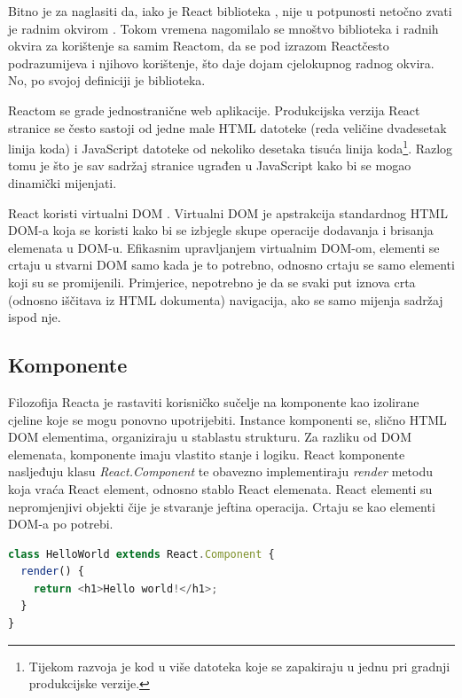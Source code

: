 \documentclass[times, utf8, zavrsni, numeric]{fer}
\newcommand{\razmakp}{\vspace{18pt}}
\newcommand{\razmaks}{\vspace{10pt}}
\begin{document}
Bitno je za naglasiti da, iako je React biblioteka , nije u potpunosti netočno zvati je radnim okvirom .
Tokom vremena nagomilalo se mnoštvo biblioteka i radnih okvira za korištenje sa samim Reactom, da se pod izrazom \glqq React\grqq često podrazumijeva i njihovo korištenje, što daje dojam cjelokupnog radnog okvira.
No, po svojoj definiciji je biblioteka\citep{reactGithub}.

\razmakp

Reactom se grade jednostranične  web aplikacije.
Produkcijska verzija React stranice se često sastoji od jedne male HTML datoteke (reda veličine dvadesetak linija koda) i JavaScript datoteke od nekoliko desetaka tisuća linija koda\footnote{Tijekom razvoja je kod u više datoteka koje se zapakiraju u jednu pri gradnji produkcijske verzije.}.
Razlog tomu je što je sav sadržaj stranice ugrađen u JavaScript kako bi se mogao dinamički mijenjati.

React koristi virtualni DOM .
Virtualni DOM je apstrakcija standardnog HTML DOM-a koja se koristi kako bi se izbjegle skupe operacije dodavanja i brisanja elemenata u DOM-u.
Efikasnim upravljanjem virtualnim DOM-om, elementi se crtaju u stvarni DOM samo kada je to potrebno, odnosno crtaju se samo elementi koji su se promijenili.
Primjerice, nepotrebno je da se svaki put iznova crta (odnosno iščitava iz HTML dokumenta) navigacija, ako se samo mijenja sadržaj ispod nje.

\razmakp


\subsection{Komponente} \label{sec:components}

Filozofija Reacta je rastaviti korisničko sučelje na komponente kao izolirane cjeline koje se mogu ponovno upotrijebiti\citep{react}.
Instance komponenti se, slično HTML DOM elementima, organiziraju u stablastu strukturu.
Za razliku od DOM elemenata, komponente imaju vlastito stanje i logiku.
React komponente nasljeđuju klasu \emph{React.Component} te obavezno implementiraju \emph{render} metodu koja vraća React element, odnosno stablo React elemenata\citep{reactDocsComponent}.
React elementi su nepromjenjivi objekti čije je stvaranje jeftina operacija.
Crtaju se kao elementi DOM-a po potrebi\citep{reactDocsRenderElem}.

\razmakp
\begin{lstlisting}[language=JavaScript, caption={Primjer komponente}, label={lst:component_example}]
class HelloWorld extends React.Component {
  render() {
    return <h1>Hello world!</h1>;
  }
}
\end{lstlisting}
\razmaks
\end{document}
